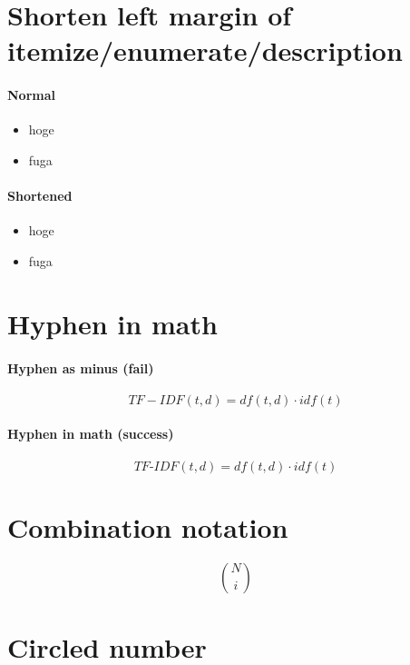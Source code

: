 \documentclass{article}
\begin{document}
\section{Shorten left margin of itemize/enumerate/description}

\paragraph{Normal}

\begin{itemize}
	\item hoge
	\item fuga
\end{itemize}

\paragraph{Shortened}

\begin{itemize}[leftmargin=*]
	\item hoge
	\item fuga
\end{itemize}


\section{Hyphen in math}

\paragraph{Hyphen as minus (fail)}

\[ TF-IDF(t, d) = df(t, d) \cdot idf(t) \]

\paragraph{Hyphen in math (success)}

\[ TF\mbox{-}IDF(t, d) = df(t, d) \cdot idf(t) \]


\section{Combination notation}

\[ N\choose{i} \]


\section{Circled number}
\end{document}
